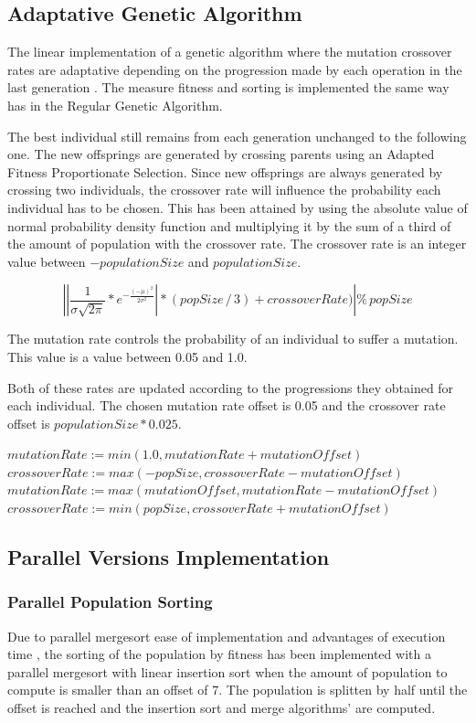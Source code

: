 \documentclass[runningheads]{llncs}
\begin{document}
\subsection{Adaptative Genetic Algorithm}
The linear implementation of a genetic algorithm where the mutation crossover rates are adaptative  depending on the progression made by each operation in the last generation \cite{adaptativeCrossOverMutation}. The measure fitness and sorting is implemented the same way has in the Regular Genetic Algorithm.

The best individual still remains from each generation unchanged to the following one. The new offsprings are generated by crossing parents using an Adapted Fitness Proportionate Selection. Since new offsprings are always generated by crossing two individuals, the crossover rate will influence the probability each individual has to be chosen. This has been attained by using the absolute value of  normal probability density function and multiplying it by the sum of a third of the amount of population with the crossover rate. The crossover rate is an integer value between \(-populationSize\) and \(populationSize\).

\[ \left |\left | \frac{1}{\sigma \sqrt{2\pi}}*e^{-\frac{(-\mu)^2}{2\sigma^2}} \right | * (popSize\,/\,3) + crossoverRate)  \right | \%  \, popSize \]	

The mutation rate controls the probability of an individual to suffer a mutation. This value is a value between 0.05 and 1.0.

Both of these rates are updated according to the progressions they obtained for each individual. The chosen mutation rate offset is 0.05 and the crossover rate offset is \(populationSize * 0.025\).

\begin{algorithmic}
        \State $mutationRate := min(1.0, mutationRate + mutationOffset)$
        \State $crossoverRate := max(-popSize, crossoverRate - mutationOffset)$
\EndIf
{}
        \State $mutationRate := max(mutationOffset, mutationRate - mutationOffset)$
        \State $crossoverRate := min(popSize, crossoverRate + mutationOffset)$
\EndIf
\end{algorithmic}

\subsection{Parallel Versions Implementation}
\subsubsection{Parallel Population Sorting} \label{subsubsec:parallelSort} \hfill \par
Due to parallel mergesort ease of implementation and advantages of execution time \cite{analysisMergeSort}, the sorting of the population by fitness has been implemented with a parallel mergesort with linear insertion sort when the amount of population to compute is smaller than an offset of 7. The population is splitten by half until the offset is reached and the insertion sort and merge algorithms' are computed.
\end{document}
